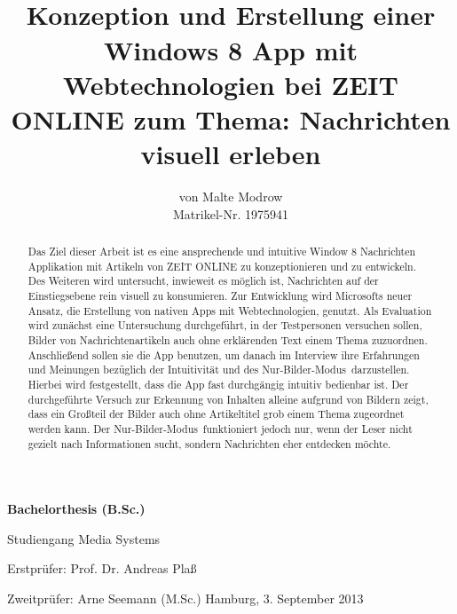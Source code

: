 \documentclass[12pt,a4paper,bibtotoc,abstracton]{scrartcl}
\author{von Malte Modrow \\ Matrikel-Nr. 1975941}
\title{\HRule \\ Konzeption und Erstellung einer Windows 8 App mit Webtechnologien bei ZEIT ONLINE zum Thema: Nachrichten visuell erleben \HRule}
\date{}
\begin{document}
\pagestyle{empty}
\maketitle
\thispagestyle{empty}
\begin{center}		
	\LARGE
	\textbf{Bachelorthesis (B.Sc.)}
	
	\Large 
	Studiengang Media Systems 
	
	\vfill	
	\large
  	Erstprüfer: Prof. Dr. Andreas Plaß
	
	Zweitprüfer: Arne Seemann (M.Sc.)
	\vfill
	Hamburg, 3. September 2013	
\end{center}

\newpage
{}
\begin{abstract}
Das Ziel dieser Arbeit ist es eine ansprechende und intuitive Window 8 Nachrichten Applikation mit Artikeln von ZEIT ONLINE zu konzeptionieren und zu entwickeln. Des Weiteren wird untersucht, inwieweit es möglich ist, Nachrichten auf der Einstiegsebene rein visuell zu konsumieren. Zur Entwicklung wird Microsofts neuer Ansatz, die Erstellung von nativen Apps mit Webtechnologien, genutzt. Als Evaluation wird zunächst eine Untersuchung durchgeführt, in der Testpersonen versuchen sollen, Bilder von Nachrichtenartikeln auch ohne erklärenden Text einem Thema zuzuordnen. Anschließend sollen sie die App benutzen, um danach im Interview ihre Erfahrungen und Meinungen bezüglich der Intuitivität und des \glqq Nur-Bilder-Modus\grqq\ darzustellen. Hierbei wird festgestellt, dass die App fast durchgängig intuitiv bedienbar ist. Der durchgeführte Versuch zur Erkennung von Inhalten alleine aufgrund von Bildern zeigt, dass ein Großteil der Bilder auch ohne Artikeltitel grob einem Thema zugeordnet werden kann. Der \glqq Nur-Bilder-Modus\grqq\ funktioniert jedoch nur, wenn der Leser nicht gezielt nach Informationen sucht, sondern Nachrichten eher entdecken möchte.
\end{abstract}
\end{document}
